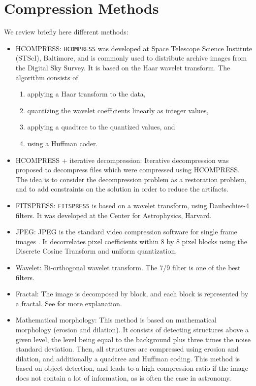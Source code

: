 \section{Compression Methods}
We review briefly here different methods:
\begin{itemize}
\baselineskip=0.4truecm
\item{HCOMPRESS: }
{\tt HCOMPRESS} \cite{compress:white92} was developed at 
 Space Telescope Science Institute (STScI), 
Baltimore, and is commonly
used to distribute archive images from the Digital Sky Survey.
It is based on the Haar wavelet transform. The algorithm consists of
\begin{enumerate}
\item applying a Haar transform to the data,
\item quantizing the wavelet coefficients linearly as integer values,
\item applying a quadtree to the quantized values, and 
\item using a Huffman coder.
\end{enumerate}
 
\item{HCOMPRESS + iterative decompression: }
Iterative decompression was proposed \cite{compress:bijaoui96} 
to decompress files which
were compressed using HCOMPRESS. The idea is to consider the decompression
problem as a restoration problem, and to add constraints on the solution in
order to reduce the artifacts.

\item{FITSPRESS: }
{\tt FITSPRESS} \cite{compress:press92} is based on a wavelet transform, using
Daubechies-4 filters.
It was developed at the Center for Astrophysics, Harvard.
 
\item{JPEG: }
JPEG is the standard video compression software   
for single frame images \cite{compress:furht95}.
It decorrelates pixel coefficients within 8 by 8 pixel blocks using the 
Discrete Cosine 
Transform and uniform quantization. 

\item{Wavelet: }
Bi-orthogonal wavelet transform. The 7/9 filter is one of the best filters.
\cite{wave:antonini92}

\item{Fractal: }
The image is decomposed by block, and each block is represented by a fractal.
See \cite{compress:fisher94} for more explanation.

\item{Mathematical morphology: }
This method is based on mathematical morphology \cite{compress:huang91_1} (erosion and dilation).
It consists of detecting structures above a given level, the level being
equal to the background plus three times the noise standard deviation.
Then, all structures are compressed using erosion and dilation, and
additionally a quadtree and Huffman coding. This method is based on object 
detection, and leads to a high compression ratio if the image does not contain
a lot of information, as is often the case in astronomy. 


\end{itemize}
